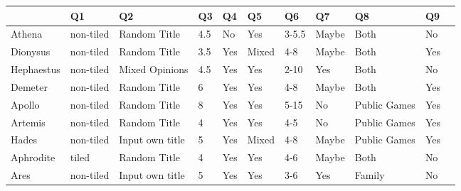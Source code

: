 \documentclass{sigchi}
\begin{document}
\label{apx:interview-responses}
\begin{tabular}{ | l | l | l | l | l | l | l | l | l | l | l | }
\hline
	  & Q1 & Q2 & Q3 & Q4 & Q5 & Q6 & Q7 & Q8 & Q9 \\ \hline
	Athena & non-tiled & Random Title & 4.5 & No & Yes & 3-5.5 & Maybe & Both & No \\ \hline
	Dionysus & non-tiled & Random Title & 3.5 & Yes & Mixed & 4-8 & Maybe & Both & Yes \\ \hline
	Hephaestus & non-tiled & Mixed Opinions & 4.5 & Yes & Yes & 2-10 & Yes & Both & No \\ \hline
	Demeter & non-tiled & Random Title & 6 & Yes & Yes & 4-8 & Maybe & Both & Yes \\ \hline
	Apollo & non-tiled & Random Title & 8 & Yes & Yes & 5-15 & No & Public Games & Yes \\ \hline
	Artemis & non-tiled & Random Title & 4 & Yes & Yes & 4-5 & No & Public Games & Yes \\ \hline
	Hades & non-tiled & Input own title & 5 & Yes & Mixed & 4-8 & Maybe & Public Games & Yes \\ \hline
	Aphrodite & tiled & Random Title & 4 & Yes & Yes & 4-6 & Maybe & Both & No \\ \hline
	Ares & non-tiled & Input own title & 5 & Yes & Yes & 3-6 & Yes & Family & No \\ \hline
\end{tabular}




\label{apx:risks}
\end{document}
